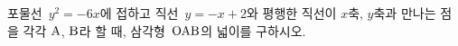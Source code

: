 포물선~$y^2=-6x$에 접하고 직선~$y=-x+2$와 평행한 직선이 $x$축, $y$축과 만나는 점을 각각 $\mathrm{A}$, $\mathrm{B}$라 할 때, 삼각형~$\mathrm{OAB}$의 넓이를 구하시오. 
